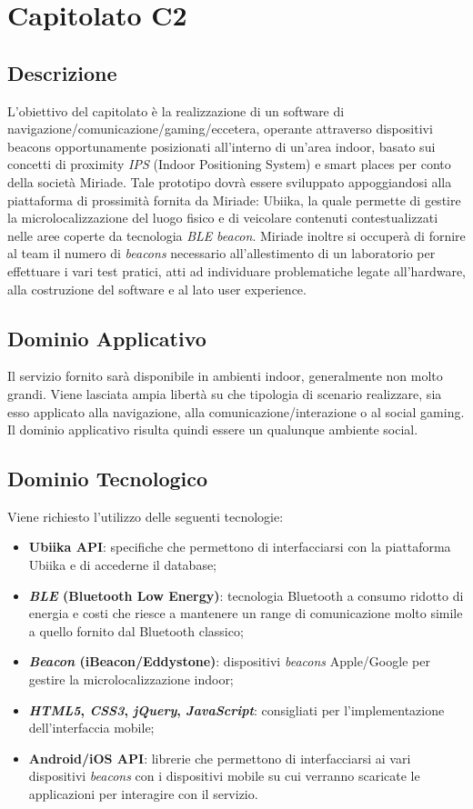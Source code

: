 \newpage
\section{Capitolato C2}
\subsection{Descrizione}
L'obiettivo del capitolato è la realizzazione di un software di navigazione/comunicazione/gaming/eccetera, operante attraverso dispositivi beacons opportunamente posizionati all'interno di un'area indoor, basato sui concetti di proximity \textit{IPS} (Indoor Positioning System) e smart places per conto della società Miriade. Tale prototipo dovrà essere sviluppato appoggiandosi alla piattaforma di prossimità fornita da Miriade: Ubiika, la quale permette di gestire la microlocalizzazione del luogo fisico e di veicolare contenuti contestualizzati nelle aree coperte da tecnologia \textit{BLE} \textit{beacon}. Miriade inoltre si occuperà di fornire al team il numero di \textit{beacons} necessario all'allestimento di un laboratorio per effettuare i vari test pratici, atti ad individuare problematiche legate all'hardware, alla costruzione del software e al lato user experience.     

\subsection{Dominio Applicativo}
Il servizio fornito sarà disponibile in ambienti indoor, generalmente non molto grandi. Viene lasciata ampia libertà su che tipologia di scenario realizzare, sia esso applicato alla navigazione, alla comunicazione/interazione o al social gaming. Il dominio applicativo risulta quindi essere un qualunque ambiente social. 

\subsection{Dominio Tecnologico}
Viene richiesto l'utilizzo delle seguenti tecnologie:
\begin{itemize}
\item \textbf{Ubiika API}: specifiche che permettono di interfacciarsi con la piattaforma Ubiika e di accederne il database;
\item \textbf{\textit{BLE} (Bluetooth Low Energy)}: tecnologia Bluetooth a consumo ridotto di energia e costi che riesce a mantenere un range di comunicazione molto simile a quello fornito dal Bluetooth classico;
\item \textbf{\textit{Beacon} (iBeacon/Eddystone)}: dispositivi \textit{beacons} Apple/Google per gestire la microlocalizzazione indoor;
\item \textbf{\textit{HTML5}, \textit{CSS3}, \textit{jQuery}, \textit{JavaScript}}: consigliati per l'implementazione dell'interfaccia mobile;
\item \textbf{Android/iOS API}: librerie che permettono di interfacciarsi ai vari dispositivi \textit{beacons} con i dispositivi mobile su cui verranno scaricate le applicazioni per interagire con il servizio.
\end{itemize}

